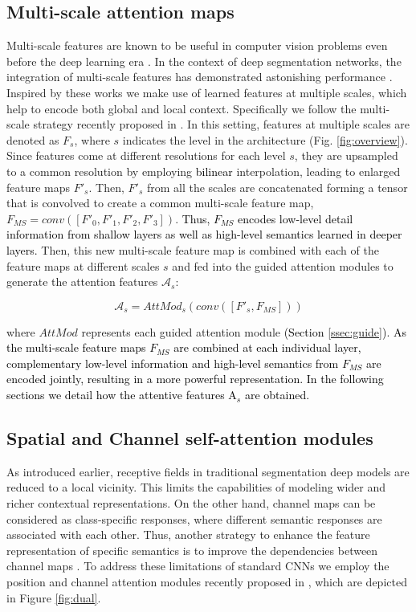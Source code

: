 \documentclass[journal]{IEEEtran}
\begin{document}
\subsection{Multi-scale attention maps}

Multi-scale features are known to be useful in computer vision problems even before the deep learning era \cite{arbelaez2010contour}. In the context of deep segmentation networks, the integration of multi-scale features has demonstrated astonishing performance \cite{chen2016attention,hariharan2015hypercolumns,mostajabi2015feedforward}.
Inspired by these works we make use of learned features at multiple scales, which help to encode both global and local context. Specifically we follow the multi-scale strategy recently proposed in \cite{wang18d}. In this setting, features at multiple scales are denoted as $F_s$, where $s$ indicates the level in the architecture (Fig. \ref{fig:overview}). Since features come at different resolutions for each level $s$, they are upsampled to a common resolution by employing \textcolor{black}{bilinear} interpolation, leading to enlarged feature maps $F'_s$. Then, $F'_s$ from all the scales are concatenated forming a tensor that is convolved to create a common multi-scale feature map, $F_{MS}=conv([F'_0,F'_1,F'_2,F'_3])$. \textcolor{black}{Thus, $F_{MS}$ encodes low-level detail information from shallow layers as well as high-level semantics learned in deeper layers.} Then, this new multi-scale feature map is combined with each of the feature maps at different scales $s$ and fed into the guided attention modules to generate the attention features $\mathcal{A}_s$:

\begin{equation}
    \mathcal{A}_{s} = AttMod_{s}(conv([F'_{s},F_{MS}]))
\end{equation}

where $AttMod$ represents each guided attention module \textcolor{black}{(Section \ref{ssec:guide})}. \textcolor{black}{As the multi-scale feature maps $F_{MS}$ are combined at each individual layer, complementary low-level information and high-level semantics from $F_{MS}$ are encoded jointly, resulting in a more powerful representation. In the following sections we detail how the attentive features A$_s$ are obtained.}


\subsection{Spatial and Channel self-attention modules}
As introduced earlier, receptive fields in traditional segmentation deep models are reduced to a local vicinity. This limits the capabilities of modeling wider and richer contextual representations. On the other hand, channel maps can be considered as class-specific responses, where different semantic responses are associated with each other. Thus, another strategy to enhance the feature representation of specific semantics is to improve the dependencies between channel maps \cite{chen2017sca}. To address these limitations of standard CNNs we employ the position and channel attention modules recently proposed in \cite{fu2018dual}, which are depicted in Figure \ref{fig:dual}.
\end{document}
